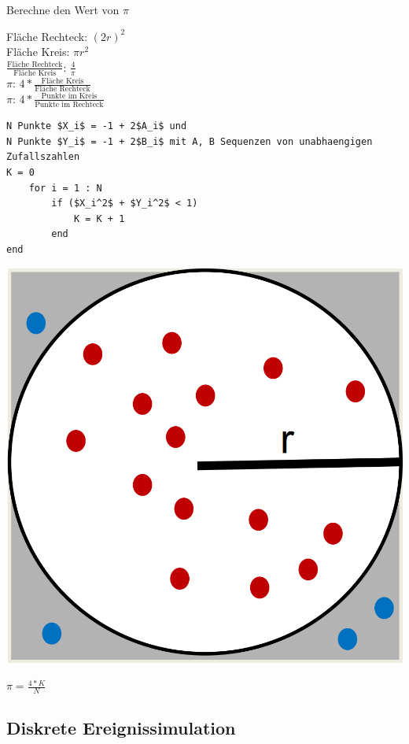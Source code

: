 \begin{example}
	Berechne den Wert von $\pi$
	\begin{multicols}{5}
		Fläche Rechteck: $(2r)^2$ \\
		Fläche Kreis: $\pi r^2$ \\
		$\frac{\text{Fläche Rechteck}}{\text{Fläche Kreis}}$: $\frac{4}{\pi}$ \\
		$\pi$: $4 * \frac{\text{Fläche Kreis}}{\text{Fläche Rechteck}}$ \\
		$\pi$: $4 * \frac{\text{Punkte im Kreis}}{\text{Punkte im Rechteck}}$	
	\end{multicols}
	\begin{minipage}[h]{0.825\textwidth}
		\begin{lstlisting}[mathescape=true, tabsize=2]
N Punkte $X_i$ = -1 + 2$A_i$ und
N Punkte $Y_i$ = -1 + 2$B_i$ mit A, B Sequenzen von unabhaengigen Zufallszahlen
K = 0
	for i = 1 : N
		if ($X_i^2$ + $Y_i^2$ < 1)
			K = K + 1
		end
end
		\end{lstlisting}
	\end{minipage}
	\begin{minipage}[h]{0.175\textwidth}
		\includegraphics[width=1\textwidth]{pictures/montecarlopi}
	\end{minipage}
	$\pi = \frac{4*K}{N}$
\end{example}

\subsection{Diskrete Ereignissimulation}
